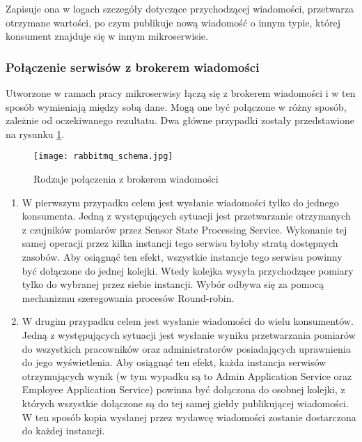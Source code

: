 Zapisuje ona w logach szczegóły dotyczące przychodzącej wiadomości, przetwarza 
otrzymane wartości, po czym publikuje nową wiadomość o innym typie, której konsument 
znajduje się w innym mikroserwisie.

\subsubsection{Połączenie serwisów z brokerem wiadomości}

Utworzone w ramach pracy mikroserwisy łączą się z brokerem wiadomości i w ten sposób wymieniają między
sobą dane. Mogą one być połączone w różny sposób, zależnie od oczekiwanego rezultatu. Dwa główne
przypadki zostały przedstawione na rysunku \ref{fig:rabbitmq-polaczenie}.

\begin{figure}[h]
    \centering
    \texttt{[image: rabbitmq\_schema.jpg]}
    \caption{Rodzaje połączenia z brokerem wiadomości}
    \label{fig:rabbitmq-polaczenie}
\end{figure}

\begin{enumerate}
    \item W pierwszym przypadku celem jest wysłanie wiadomości tylko do jednego konsumenta. Jedną
    z występujących sytuacji jest przetwarzanie otrzymanych z czujników pomiarów przez Sensor State
    Processing Service. Wykonanie tej samej operacji przez kilka instancji tego serwisu byłoby stratą
    dostępnych zasobów. Aby osiągnąć ten efekt, wszystkie instancje tego serwisu powinny być dołączone 
    do jednej kolejki. Wtedy kolejka wysyła przychodzące pomiary tylko do wybranej przez siebie instancji.
    Wybór odbywa się za pomocą mechanizmu szeregowania procesów Round-robin.
    \item W drugim przypadku celem jest wysłanie wiadomości do wielu konsumentów. Jedną z występujących
    sytuacji jest wysłanie wyniku przetwarzania pomiarów do wszystkich pracowników oraz administratorów
    posiadających uprawnienia do jego wyświetlenia. Aby osiągnąć ten efekt, każda instancja serwisów
    otrzymujących wynik (w tym wypadku są to Admin Application Service oraz Employee Application Service)
    powinna być dołączona do osobnej kolejki, z których wszystkie dołączone są do tej samej giełdy
    publikującej wiadomości. W ten sposób kopia wysłanej przez wydawcę wiadomości zostanie dostarczona
    do każdej instancji.
\end{enumerate}

